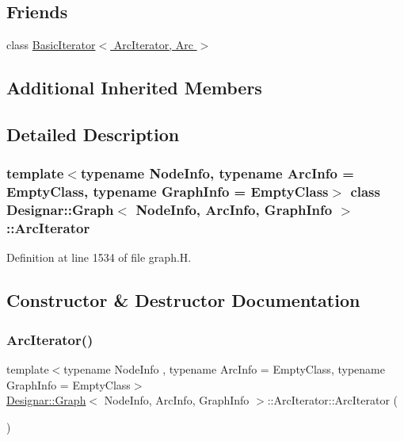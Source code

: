 \subsection*{Friends}
\begin{DoxyCompactItemize}
\item 
class \hyperlink{class_designar_1_1_graph_1_1_arc_iterator_a530ad7c7218fa9b74a5cce004d0e3a1c}{Basic\+Iterator$<$ Arc\+Iterator, Arc $>$}
\end{DoxyCompactItemize}
\subsection*{Additional Inherited Members}


\subsection{Detailed Description}
\subsubsection*{template$<$typename Node\+Info, typename Arc\+Info = Empty\+Class, typename Graph\+Info = Empty\+Class$>$\newline
class Designar\+::\+Graph$<$ Node\+Info, Arc\+Info, Graph\+Info $>$\+::\+Arc\+Iterator}



Definition at line 1534 of file graph.\+H.



\subsection{Constructor \& Destructor Documentation}
\mbox{\label{class_designar_1_1_graph_1_1_arc_iterator_a642cf08854577ea29ba520ee882c9d54}} 
\subsubsection{\texorpdfstring{Arc\+Iterator()}{ArcIterator()}\hspace{0.1cm}{\footnotesize\ttfamily [1/5]}}
{\footnotesize\ttfamily template$<$typename Node\+Info , typename Arc\+Info  = Empty\+Class, typename Graph\+Info  = Empty\+Class$>$ \\
\hyperlink{class_designar_1_1_graph}{Designar\+::\+Graph}$<$ Node\+Info, Arc\+Info, Graph\+Info $>$\+::Arc\+Iterator\+::\+Arc\+Iterator (\begin{DoxyParamCaption}{ }\end{DoxyParamCaption})\hspace{0.3cm}{\ttfamily [inline]}}



